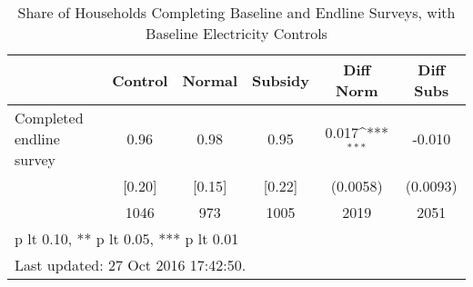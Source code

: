 \begin{table}[htbp]\centering
\def\sym#1{\ifmmode^{#1}\else\(^{#1}\)\fi}
\caption{Share of Households Completing Baseline and Endline Surveys, with Baseline Electricity Controls \label{tab:"balance"}}
\begin{tabular*}{0.9\hsize}{@{\hskip\tabcolsep\extracolsep\fill}l*{1}{ccccc}}
\toprule
                                &  Control&   Normal&  Subsidy&Diff Norm         &Diff Subs         \\
\midrule
Completed endline survey        &     0.96&     0.98&     0.95&    0.017\sym{***}&   -0.010         \\
                                &   [0.20]&   [0.15]&   [0.22]& (0.0058)         & (0.0093)         \\
                                &     1046&      973&     1005&     2019         &     2051         \\
\bottomrule
\multicolumn{6}{l}{\footnotesize * p lt 0.10, ** p lt 0.05, *** p lt 0.01}\\
\multicolumn{6}{l}{\footnotesize Last updated: 27 Oct 2016 17:42:50.}\\
\end{tabular*}
\end{table}
